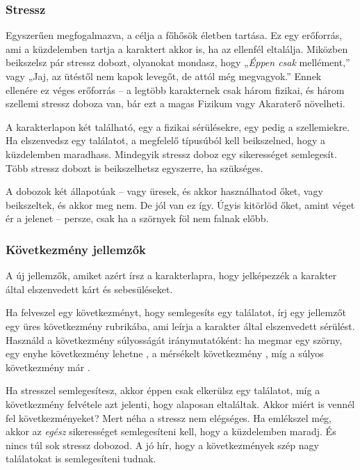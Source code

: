 \subsubsection{Stressz}

Egyszerűen megfogalmazva, a  célja a főhősök életben tartása. Ez egy erőforrás, ami a küzdelemben tartja a karaktert akkor is, ha az ellenfél eltalálja. Miközben beikszelsz pár stressz dobozt, olyanokat mondasz, hogy „\emph{Éppen csak} mellément,” vagy „Jaj, az ütéstől nem kapok levegőt, de attól még megvagyok.” Ennek ellenére ez véges erőforrás – a legtöbb karakternek csak három fizikai, és három szellemi stressz doboza van, bár ezt a magas Fizikum vagy Akaraterő növelheti.

A karakterlapon két  található, egy a fizikai sérülésekre, egy pedig a szellemiekre. Ha elszenvedsz egy találatot, a megfelelő típusúból kell beikszelned, hogy a küzdelemben maradhass. Mindegyik stressz doboz egy sikerességet semlegesít. Több stressz dobozt is beikszelhetsz egyszerre, ha szükséges.

A dobozok két állapotúak – vagy üresek, és akkor használhatod őket, vagy beikszeltek, és akkor meg nem. De jól van ez így. Úgyis kitörlöd őket, amint véget ér a jelenet – persze, csak ha a szörnyek föl nem falnak előbb.

\subsubsection{Következmény jellemzők}

A  új jellemzők, amiket azért írsz a karakterlapra, hogy jelképezzék a karakter által elszenvedett kárt és sebesüléseket.

Ha felveszel egy következményt, hogy semlegesíts egy találatot, írj egy jellemzőt egy üres következmény rubrikába, ami leírja a karakter által elszenvedett sérülést. Használd a következmény súlyosságát iránymutatóként: ha megmar egy szörny, egy enyhe következmény lehetne , a mérsékelt következmény , míg a súlyos következmény már .

Ha stresszel semlegesítesz, akkor éppen csak elkerülsz egy találatot, míg a következmény felvétele azt jelenti, hogy alaposan eltaláltak. Akkor miért is vennél fel következményeket? Mert néha a stressz nem elégséges. Ha emlékszel még, akkor az \emph{egész} sikerességet semlegesíteni kell, hogy a küzdelemben maradj. És nincs túl sok stressz dobozod. A jó hír, hogy a következmények szép nagy találatokat is semlegesíteni tudnak.

